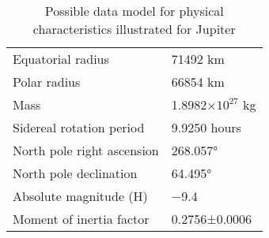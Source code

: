 \begin{table}[h]
\begin{tabular}{ | l | l |}
\hline
Equatorial radius&71492 km  \\
Polar radius&66854 km  \\
Mass&1.8982×$10^27$ kg  \\
Sidereal rotation period&9.9250 hours  \\
North pole right ascension&268.057° \\
North pole declination&64.495° \\
Absolute magnitude (H)&−9.4 \\
Moment of inertia factor&0.2756±0.0006  \\
\hline
\end{tabular}
\caption{Possible data model for physical characteristics illustrated for Jupiter}
\end{table}
\fi

